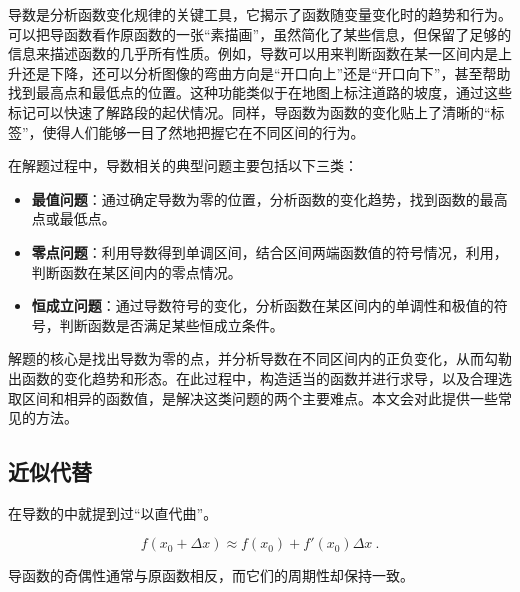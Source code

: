 
\begin{issues}
\issueDraft
\end{issues}


导数是分析函数变化规律的关键工具，它揭示了函数随变量变化时的趋势和行为。可以把导函数看作原函数的一张“素描画”，虽然简化了某些信息，但保留了足够的信息来描述函数的几乎所有性质。例如，导数可以用来判断函数在某一区间内是上升还是下降，还可以分析图像的弯曲方向是“开口向上”还是“开口向下”，甚至帮助找到最高点和最低点的位置。这种功能类似于在地图上标注道路的坡度，通过这些标记可以快速了解路段的起伏情况。同样，导函数为函数的变化贴上了清晰的“标签”，使得人们能够一目了然地把握它在不同区间的行为。

在解题过程中，导数相关的典型问题主要包括以下三类：

\begin{itemize}
\item \textbf{最值问题}：通过确定导数为零的位置，分析函数的变化趋势，找到函数的最高点或最低点。
\item \textbf{零点问题}：利用导数得到单调区间，结合区间两端函数值的符号情况，利用，判断函数在某区间内的零点情况。
\item \textbf{恒成立问题}：通过导数符号的变化，分析函数在某区间内的单调性和极值的符号，判断函数是否满足某些恒成立条件。
\end{itemize}

解题的核心是找出导数为零的点，并分析导数在不同区间内的正负变化，从而勾勒出函数的变化趋势和形态。在此过程中，构造适当的函数并进行求导，以及合理选取区间和相异的函数值，是解决这类问题的两个主要难点。本文会对此提供一些常见的方法。

\subsection{近似代替}

在导数的中就提到过“以直代曲”。

\begin{equation}
f(x_0+\Delta x)\approx f(x_0)+f'(x_0)\Delta x~.
\end{equation}

导函数的奇偶性通常与原函数相反，而它们的周期性却保持一致。


